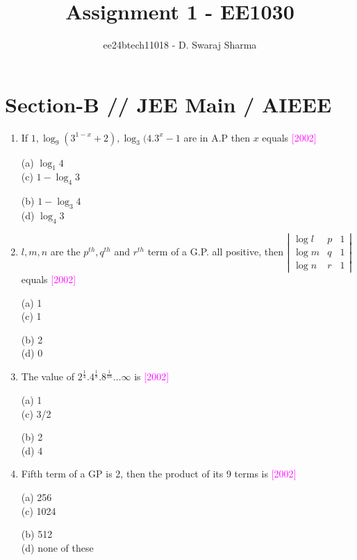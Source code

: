 \documentclass[journal,12pt,twocolumn]{IEEEtran}
\theoremstyle{remark}
\begin{document}

\vspace{3cm}

\title{Assignment 1 - EE1030}
\author{ee24btech11018 - D. Swaraj Sharma}
\maketitle
\newpage
\bigskip

\renewcommand{\thefigure}{\theenumi}
\renewcommand{\thetable}{\theenumi}

\section*{\textbf{Section-B} // \textbf{JEE Main} / \textbf{AIEEE}}

\begin{enumerate}[label=\textcolor{magenta}{\arabic*.}]
\newcommand{\question}[6]{
	 #1 \textcolor {magenta}{\hfill #2}\\
\begin{minipage}{0.2\textwidth}
(a) #3 \\
(c) #5 \\
\end{minipage}
\hfill
\begin{minipage}{0.2\textwidth}
(b) #4 \\
(d) #6 \\
\end{minipage}

}

\item \question{If $ 1, \log_9 (3^{1-x} +2), \log_3 (4.3^x -1$ are in A.P then $x$ equals}{[2002]}
  {$\log_1 4$}
  {$1-\log_3 4$}
  {$1-\log_4 3$}
  {$\log_4 3$}

\item \question{$l, m, n$ are the $p^{th}, q^{th}$ and $r^{th}$ term of a G.P. all positive, then $\left|\begin{matrix} \log l & p & 1 \\ \log m & q & 1 \\ \log n & r & 1 \end{matrix}\right|$ equals}{[2002]}
{1}
{2}
{1}
{0}

\item \question{The value of $2^{\frac{1}{4}} . 4^{\frac{1}{8}} . 8^{\frac{1}{16}} \ldots \infty$ is}{[2002]}
  {1}
  {2}
  {3/2}
  {4}

\item \question{Fifth term of a GP is 2, then the product of its 9 terms is}{[2002]}
  {256}
  {512}
  {1024}
  {none of these}


\end{enumerate}
\end{document}

